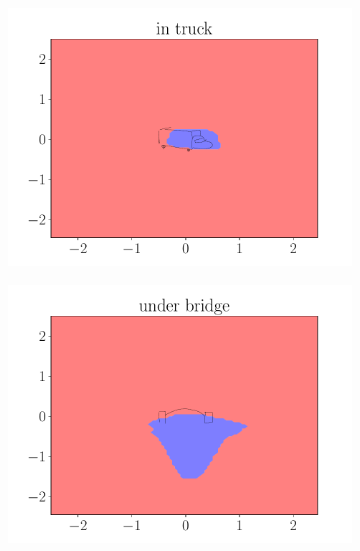 \documentclass{beamer}
\begin{document}
\begin{frame}
\begin{figure}[ht]
\begin{subfigure}{0.45\textwidth}
        \end{subfigure}
        \begin{subfigure}{0.45\textwidth}
            \centering
            \includegraphics[width=\textwidth]{figures/in_truck.pdf}
        \end{subfigure}
        \begin{subfigure}{0.45\textwidth}
            \centering
            \includegraphics[width=\textwidth]{figures/under_bridge.pdf}
        \end{subfigure}
    \end{figure}
\end{frame}
\end{document}
